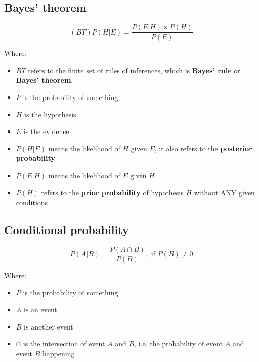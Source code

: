 \documentclass[11pt]{article}
\begin{document}
\subsection{Bayes' theorem}
\label{sec:orgf167da6}
\[(BT) P(H | E) = \frac{P(E | H) \times P(H)}{P(E)}\]

Where:
\begin{itemize}
\item \(BT\) refers to the finite set of rules of inferences, which is \textbf{Bayes' rule} or \textbf{Bayes' theorem}.
\item \(P\) is the probability of something
\item \(H\) is the hypothesis
\item \(E\) is the evidence
\item \(P(H | E)\) means the likelihood of \(H\) given \(E\), it also refers to the \textbf{posterior probability}
\item \(P(E | H)\) means the likelihood of \(E\) given \(H\)
\item \(P(H)\) refers to the \textbf{prior probability} of hypothesis \(H\) without ANY given conditions
\end{itemize}
\subsection{Conditional probability}
\label{sec:org1ee816d}
\[P(A | B) = \frac{P (A \cap B)}{P(B)}, \text{ if } P(B) \ne 0\]

Where:
\begin{itemize}
\item \(P\) is the probability of something
\item \(A\) is an event
\item \(B\) is another event
\item \(\cap\) is the intersection of event \(A\) and \(B\), i.e. the probability of event \(A\) and event \(B\) happening
\end{itemize}
\end{document}
